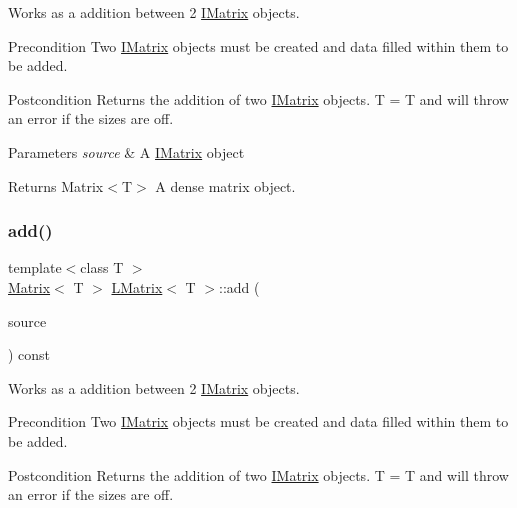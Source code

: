 Works as a addition between 2 \mbox{\hyperlink{class_i_matrix}{I\+Matrix}} objects. 

\begin{DoxyPrecond}{Precondition}
Two \mbox{\hyperlink{class_i_matrix}{I\+Matrix}} objects must be created and data filled within them to be added. 
\end{DoxyPrecond}
\begin{DoxyPostcond}{Postcondition}
Returns the addition of two \mbox{\hyperlink{class_i_matrix}{I\+Matrix}} objects. T = T and will throw an error if the sizes are off.
\end{DoxyPostcond}

\begin{DoxyParams}{Parameters}
{\em source} & A \mbox{\hyperlink{class_i_matrix}{I\+Matrix}} object \\
\hline
\end{DoxyParams}
\begin{DoxyReturn}{Returns}
Matrix$<$\+T$>$ A dense matrix object. 
\end{DoxyReturn}
\mbox{\label{class_l_matrix_a18418777c3d498210d3a9c019583d0b9}} 
\subsubsection{\texorpdfstring{add()}{add()}\hspace{0.1cm}{\footnotesize\ttfamily [3/6]}}
{\footnotesize\ttfamily template$<$class T $>$ \\
\mbox{\hyperlink{class_matrix}{Matrix}}$<$ T $>$ \mbox{\hyperlink{class_l_matrix}{L\+Matrix}}$<$ T $>$\+::add (\begin{DoxyParamCaption}\item[{const \mbox{\hyperlink{class_i_matrix}{I\+Matrix}}$<$ \mbox{\hyperlink{class_l_matrix}{L\+Matrix}}$<$ T $>$, T $>$ \&}]{source }\end{DoxyParamCaption}) const\hspace{0.3cm}{\ttfamily [virtual]}}



Works as a addition between 2 \mbox{\hyperlink{class_i_matrix}{I\+Matrix}} objects. 

\begin{DoxyPrecond}{Precondition}
Two \mbox{\hyperlink{class_i_matrix}{I\+Matrix}} objects must be created and data filled within them to be added. 
\end{DoxyPrecond}
\begin{DoxyPostcond}{Postcondition}
Returns the addition of two \mbox{\hyperlink{class_i_matrix}{I\+Matrix}} objects. T = T and will throw an error if the sizes are off.
\end{DoxyPostcond}

